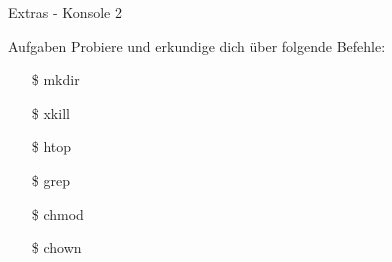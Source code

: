 \begin{frame}{Extras - Konsole 2}

    \begin{alertblock}{Aufgaben}
        \pause
        Probiere und erkundige dich über folgende Befehle:
        \pause
        \begin{enumerate}
            \item[\$] mkdir\pause
            \item[\$] xkill\pause
            \item[\$] htop\pause
            \item[\$] grep\pause
            \item[\$] chmod\pause
            \item[\$] chown
        \end{enumerate}

    \end{alertblock}

\end{frame}
